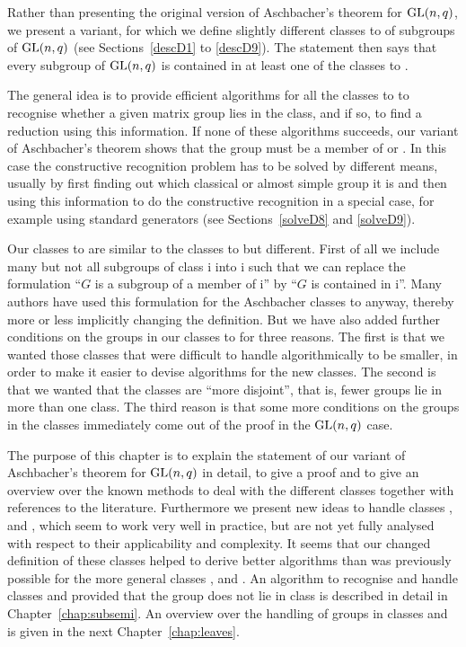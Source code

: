 Rather than presenting the original version of Aschbacher's theorem
for $\GL(n,q)$, we present a variant, for which we define slightly
different classes  to  of subgroups of $\GL(n,q)$ (see 
Sections~\ref{descD1} to \ref{descD9}). The statement
then says that every subgroup of $\GL(n,q)$ is contained in at least one
of the classes  to . 

The general idea is to provide efficient algorithms for all the classes  to
 to recognise whether a given matrix group lies in the class, and if
so, to find a reduction using this information. If none of these algorithms
succeeds, our variant of Aschbacher's theorem shows that the group must
be a member of  or . In this case the constructive recognition problem
has to be
solved by different means, usually by first finding out which classical
or almost simple group it is and then using this information to do the
constructive recognition in a special case, for example using standard
generators (see Sections~\ref{solveD8} and \ref{solveD9}).

Our classes  to  are similar to the classes  to  but
different. First of all we include many but not all subgroups of
class \CC i into \DD i such that we can replace the formulation ``$G$ is a
subgroup of a member of \CC i'' by ``$G$ is contained in \DD i''. Many
authors have used this formulation for the Aschbacher classes  to
 anyway, thereby more or less implicitly changing the definition. 
But we have also added further conditions on the groups
in our classes  to  for three reasons. The first is that we
wanted those classes that were difficult to handle algorithmically
to be smaller, in order to make it easier to devise algorithms for
the new classes. The second is that we wanted that the classes are
``more disjoint'', that is, fewer groups lie in more than one
class. The third reason is that some more conditions on the groups in
the classes immediately come out of the proof in the $\GL(n,q)$ case.

The purpose of this chapter is to explain the statement of our variant 
of Aschbacher's 
theorem for $\GL(n,q)$ in detail, to give a proof and to give an
overview over the known methods to deal with the different classes
together with references to the literature. Furthermore we present new 
ideas to handle classes ,  and , which seem to work very
well in practice, but are not yet fully analysed with respect to their
applicability and complexity. It seems that our changed definition of
these classes helped to derive better algorithms than was previously
possible for the more general classes ,  and .
An algorithm to recognise
and handle classes  and  provided that the group does not lie in
class  is described in detail in Chapter~\ref{chap:subsemi}.
An overview over the handling of groups in classes  and  is
given in the next Chapter~\ref{chap:leaves}.


